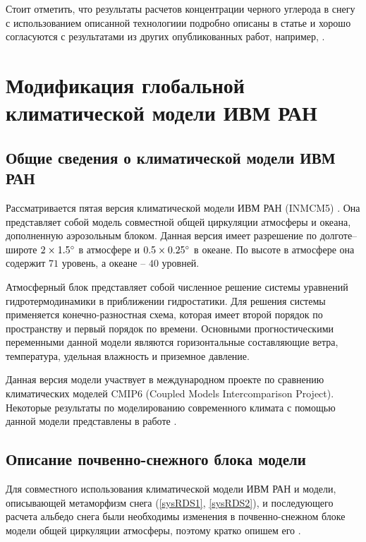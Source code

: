\documentclass[a4paper, fontsize=14pt]{scrartcl}
\begin{document}
Стоит отметить, что результаты расчетов концентрации черного углерода в снегу с использованием описанной технологиии подробно описаны в статье \cite{Chernenkov2021rus} и хорошо согласуются с результатами из других опубликованных работ, например, \cite{Flanner2007}.

\newpage
\section{Модификация глобальной климатической модели ИВМ РАН}

\subsection{Общие сведения о климатической модели ИВМ РАН}

Рассматривается пятая версия климатической модели ИВМ РАН (INMCM5) \cite{Volodin2017rus}. Она представляет собой модель совместной общей циркуляции атмосферы и океана, дополненную аэрозольным блоком. Данная версия имеет разрешение по долготе--широте $2 \times 1.5\degree$ в атмосфере и $0.5 \times 0.25\degree$ в океане. По высоте в атмосфере она содержит $71$ уровень, а океане -- $40$ уровней. \sloppy

Атмосферный блок представляет собой численное решение системы уравнений гидротермодинамики в приближении гидростатики. Для решения системы применяется конечно-разностная схема, которая имеет второй порядок по пространству и первый порядок по времени. Основными прогностическими переменными данной модели являются горизонтальные составляющие ветра, температура, удельная влажность и приземное давление. 

Данная версия модели участвует в международном проекте по сравнению климатических моделей CMIP6 (Coupled Models Intercomparison Project). Некоторые результаты по моделированию современного климата с помощью данной модели представлены в работе \cite{Volodin2017rus}.  \sloppy 


\subsection{Описание почвенно-снежного блока модели}

Для совместного использования климатической модели ИВМ РАН и модели, описывающей метаморфизм снега (\eqref{sysRDS1}, \eqref{sysRDS2}), и последующего расчета альбедо снега были необходимы изменения в почвенно-снежном блоке модели общей циркуляции атмосферы, поэтому кратко опишем его \cite{Volodin1998, Volodina2000, Machulskaya_diss}.   
\end{document}
